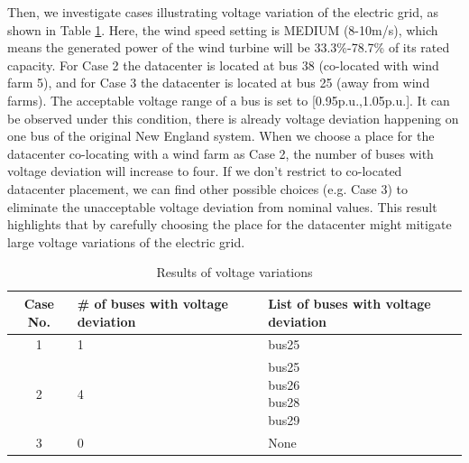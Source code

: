 Then, we investigate cases illustrating voltage variation of the electric grid, as shown in Table \ref{tab:results-volvio}. Here, the wind speed setting is MEDIUM (8-10m/s), which means the generated power of the wind turbine will be 33.3\%-78.7\% of its rated capacity. For Case 2 the datacenter is located at bus 38 (co-located with wind farm 5), and for Case 3 the datacenter is located at bus 25 (away from wind farms). The acceptable voltage range of a bus is set to [0.95p.u.,1.05p.u.]. It can be observed under this condition, there is already voltage deviation happening on one bus of the original New England system. When we choose a place for the datacenter co-locating with a wind farm as Case 2, the number of buses with voltage deviation will increase to four. If we don't restrict to co-located datacenter placement, we can find other possible choices (e.g. Case 3) to eliminate the unacceptable voltage deviation from nominal values. This result highlights that by carefully choosing the place for the datacenter might mitigate large voltage variations of the electric grid.

\begin{table}[ht]
\begin{center}
\caption{Results of voltage variations}
\begin{tabular}{|c|p{1in}|p{1in}|}
\hline
Case No. & \# of buses with voltage deviation & List of buses with voltage deviation  \\
\hline
1 & 1 & bus25\\
\hline
2 & 4 & \tabincell{c}{bus25\\bus26\\bus28\\bus29}\\
\hline
3 & 0 & None \\

\hline

\end{tabular}
\label{tab:results-volvio}
\end{center}
\end{table}

